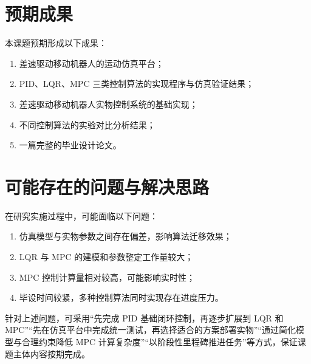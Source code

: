 \documentclass[12pt,a4paper]{ctexart}
\begin{document}
\section{预期成果}
本课题预期形成以下成果：
\begin{enumerate}[label=\arabic*.]
  \item 差速驱动移动机器人的运动仿真平台；
  \item PID、LQR、MPC 三类控制算法的实现程序与仿真验证结果；
  \item 差速驱动移动机器人实物控制系统的基础实现；
  \item 不同控制算法的实验对比分析结果；
  \item 一篇完整的毕业设计论文。
\end{enumerate}

\section{可能存在的问题与解决思路}
在研究实施过程中，可能面临以下问题：
\begin{enumerate}[label=\arabic*.]
  \item 仿真模型与实物参数之间存在偏差，影响算法迁移效果；
  \item LQR 与 MPC 的建模和参数整定工作量较大；
  \item MPC 控制计算量相对较高，可能影响实时性；
  \item 毕设时间较紧，多种控制算法同时实现存在进度压力。
\end{enumerate}

针对上述问题，可采用“先完成 PID 基础闭环控制，再逐步扩展到 LQR 和 MPC”“先在仿真平台中完成统一测试，再选择适合的方案部署实物”“通过简化模型与合理约束降低 MPC 计算复杂度”“以阶段性里程碑推进任务”等方式，保证课题主体内容按期完成。
\end{document}
